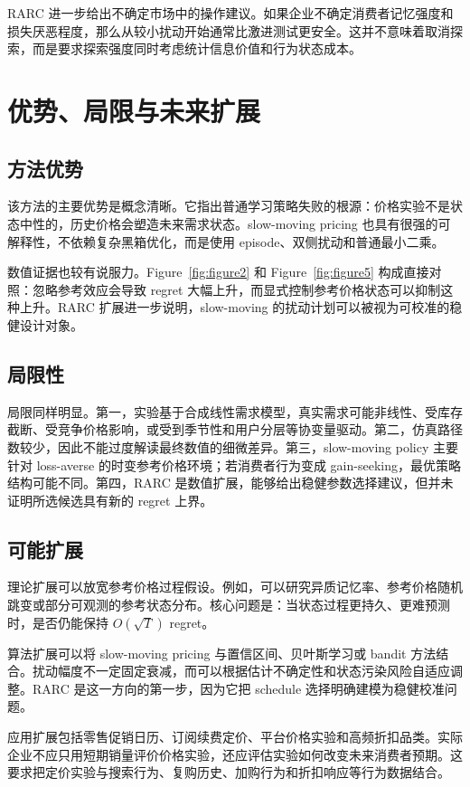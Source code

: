 \documentclass[conference]{../../LaTex_Template/IEEEtran}
\begin{document}
RARC 进一步给出不确定市场中的操作建议。如果企业不确定消费者记忆强度和损失厌恶程度，那么从较小扰动开始通常比激进测试更安全。这并不意味着取消探索，而是要求探索强度同时考虑统计信息价值和行为状态成本。

\section{优势、局限与未来扩展}
\subsection{方法优势}
该方法的主要优势是概念清晰。它指出普通学习策略失败的根源：价格实验不是状态中性的，历史价格会塑造未来需求状态。slow-moving pricing 也具有很强的可解释性，不依赖复杂黑箱优化，而是使用 episode、双侧扰动和普通最小二乘。

数值证据也较有说服力。Figure~\ref{fig:figure2} 和 Figure~\ref{fig:figure5} 构成直接对照：忽略参考效应会导致 regret 大幅上升，而显式控制参考价格状态可以抑制这种上升。RARC 扩展进一步说明，slow-moving 的扰动计划可以被视为可校准的稳健设计对象。

\subsection{局限性}
局限同样明显。第一，实验基于合成线性需求模型，真实需求可能非线性、受库存截断、受竞争价格影响，或受到季节性和用户分层等协变量驱动。第二，仿真路径数较少，因此不能过度解读最终数值的细微差异。第三，slow-moving policy 主要针对 loss-averse 的时变参考价格环境；若消费者行为变成 gain-seeking，最优策略结构可能不同。第四，RARC 是数值扩展，能够给出稳健参数选择建议，但并未证明所选候选具有新的 regret 上界。

\subsection{可能扩展}
理论扩展可以放宽参考价格过程假设。例如，可以研究异质记忆率、参考价格随机跳变或部分可观测的参考状态分布。核心问题是：当状态过程更持久、更难预测时，是否仍能保持 $O(\sqrt{T})$ regret。

算法扩展可以将 slow-moving pricing 与置信区间、贝叶斯学习或 bandit 方法结合。扰动幅度不一定固定衰减，而可以根据估计不确定性和状态污染风险自适应调整。RARC 是这一方向的第一步，因为它把 schedule 选择明确建模为稳健校准问题。

应用扩展包括零售促销日历、订阅续费定价、平台价格实验和高频折扣品类。实际企业不应只用短期销量评价价格实验，还应评估实验如何改变未来消费者预期。这要求把定价实验与搜索行为、复购历史、加购行为和折扣响应等行为数据结合。
\end{document}
